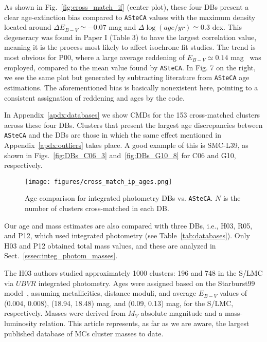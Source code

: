\documentclass{aa}
\begin{document}
As shown in Fig.~\ref{fig:cross_match_if} (center plot), these four DBs
present a clear age-extinction bias compared to \texttt{ASteCA} values with the
maximum density located around $\Delta E_{B-V}{\simeq-}0.07$ mag and
$\Delta\log(age/yr){\simeq}0.3$ dex.
This degeneracy was found in Paper I (Table 3) to have the largest
correlation value, meaning it is the process most likely to affect isochrone fit
studies.
The trend is most obvious for P00, where a large average reddening of
$E_{B-V}{\simeq}0.14$ mag~\citep{de_Grijs_2006} was employed, compared to the
mean value found by \texttt{ASteCA}.
%
In Fig. 7 on the right, we see the same plot but generated by subtracting
literature from \texttt{ASteCA} age estimations.
The aforementioned bias is basically nonexistent here, pointing to a
consistent assignation of reddening and ages by the code.

In Appendix~\ref{apdx:databases} we show CMDs for the 153 cross-matched
clusters across these four DBs.
Clusters that present the largest age discrepancies between
\texttt{ASteCA} and the DBs are those in which the same effect mentioned in
Appendix~\ref{apdx:outliers} takes place. A good example of this is SMC-L39, as
shown in Figs.~\ref{fig:DBs_C06_3} and~\ref{fig:DBs_G10_8} for C06 and G10,
respectively.\\


%

\begin{figure}
\centering
\texttt{[image: figures/cross\_match\_ip\_ages.png]}
\caption{Age comparison for integrated photometry DBs vs. \texttt{ASteCA}.
$N$ is the number of clusters cross-matched in each DB.\@}
\label{fig:cross_match_ip_age}
\end{figure}

Our age and mass estimates are also compared with three DBs, i.e., H03, R05, and
P12, which used integrated photometry (see Table~\ref{tab:databases}). Only H03
and P12 obtained total mass values, and these are analyzed in
Sect.~\ref{sssec:integ_photom_masses}.

The H03 authors studied approximately 1000 clusters: 196 and 748 in the
S/LMC via $UBVR$ integrated photometry.
Ages were assigned based on the Starburst99 model~\citep{Leitherer_1999},
assuming metallicities, distance moduli, and average $E_{B-V}$ values of (0.004,
0.008), (18.94, 18.48) mag, and  (0.09, 0.13) mag, for the S/LMC, respectively.
%
Masses were derived from $M_V$ absolute magnitude and a mass-luminosity
relation.
This article represents, as far as we are aware, the largest published database
of MCs cluster masses to date.
\end{document}
